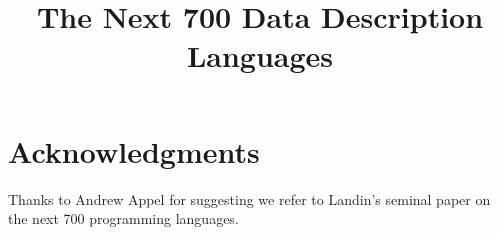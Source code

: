 \documentclass[nocopyrightspace]{sigplanconf}
\begin{document}
\title{The Next 700 Data Description Languages}
       {}

       {}
       {}



\maketitle{}

\begin{abstract}  

\end{abstract}
















%



\section*{Acknowledgments}

Thanks to Andrew Appel for
suggesting we refer to Landin's seminal paper on
the next 700 programming languages.





\end{document}
